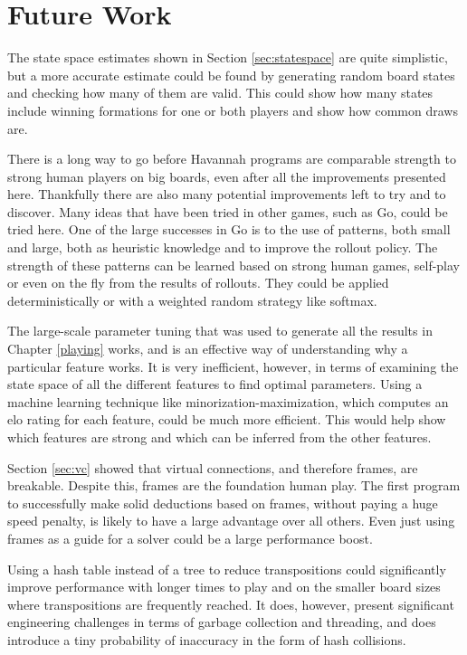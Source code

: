 \section{Future Work}

The state space estimates shown in Section \ref{sec:statespace} are quite simplistic, but a more accurate estimate could be found by generating random board states and checking how many of them are valid. This could show how many states include winning formations for one or both players and show how common draws are.

There is a long way to go before Havannah programs are comparable strength to strong human players on big boards, even after all the improvements presented here. Thankfully there are also many potential improvements left to try and to discover. Many ideas that have been tried in other games, such as Go, could be tried here. One of the large successes in Go is to the use of patterns, both small and large, both as heuristic knowledge and to improve the rollout policy. The strength of these patterns can be learned based on strong human games, self-play or even on the fly from the results of rollouts. They could be applied deterministically or with a weighted random strategy like softmax.

The large-scale parameter tuning that was used to generate all the results in Chapter \ref{playing} works, and is an effective way of understanding why a particular feature works. It is very inefficient, however, in terms of examining the state space of all the different features to find optimal parameters. Using a machine learning technique like minorization-maximization\cite{coulom2007computing}, which computes an elo rating for each feature, could be much more efficient. This would help show which features are strong and which can be inferred from the other features.

Section \ref{sec:vc} showed that virtual connections, and therefore frames, are breakable. Despite this, frames are the foundation human play. The first program to successfully make solid deductions based on frames, without paying a huge speed penalty, is likely to have a large advantage over all others. Even just using frames as a guide for a solver could be a large performance boost.

Using a hash table instead of a tree to reduce transpositions could significantly improve performance with longer times to play and on the smaller board sizes where transpositions are frequently reached. It does, however, present significant engineering challenges in terms of garbage collection and threading, and does introduce a tiny probability of inaccuracy in the form of hash collisions.

